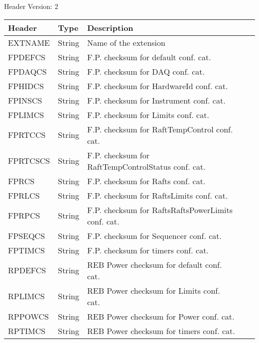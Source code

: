 Header Version: 2


\begin{tabular}{l l l l l}

\hline
Header & Type & Description \\
\hline
EXTNAME & String & Name of the extension \\
FPDEFCS & String & F.P. checksum for default conf. cat. \\
FPDAQCS & String & F.P. checksum for DAQ conf. cat. \\
FPHIDCS & String & F.P. checksum for HardwareId conf. cat. \\
FPINSCS & String & F.P. checksum for Instrument conf. cat. \\
FPLIMCS & String & F.P. checksum for Limits conf. cat. \\
FPRTCCS & String & F.P. checksum for RaftTempControl conf. cat. \\
FPRTCSCS & String & F.P. checksum for RaftTempControlStatus conf. cat. \\
FPRCS & String & F.P. checksum for Rafts conf. cat. \\
FPRLCS & String & F.P. checksum for RaftsLimits conf. cat. \\
FPRPCS & String & F.P. checksum for RaftsRaftsPowerLimits conf. cat. \\
FPSEQCS & String & F.P. checksum for Sequencer conf. cat. \\
FPTIMCS & String & F.P. checksum for timers conf. cat. \\
RPDEFCS & String & REB Power checksum for default conf. cat. \\
RPLIMCS & String & REB Power checksum for Limits conf. cat. \\
RPPOWCS & String & REB Power checksum for Power conf. cat. \\
RPTIMCS & String & REB Power checksum for timers conf. cat. \\
\hline
\end{tabular}

